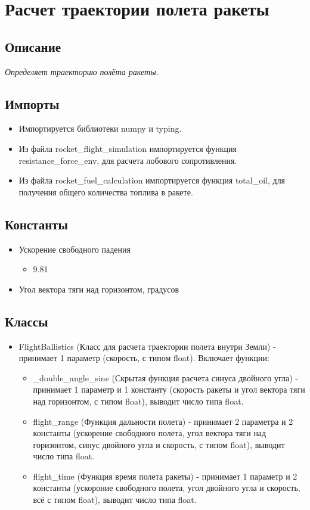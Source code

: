 \documentclass[a4paper, 12pt]{report}
\begin{document}
\chapter{Расчет траектории полета ракеты}
\section{Описание}
\textit{Определяет траекторию полёта ракеты.}
\section{Импорты}
\begin{itemize}
    \item Импортируется библиотеки numpy и typing.
    \item Из файла rocket\_flight\_simulation импортируется функция resistance\_force\_env, для расчета лобового сопротивления.
    \item Из файла rocket\_fuel\_calculation импортируется функция total\_oil, для получения общего количества топлива в ракете.
\end{itemize}
\section{Константы}
\begin{itemize}
    \item Ускорение свободного падения
    \begin{itemize}
        \item 9.81
    \end{itemize}
    \item Угол вектора тяги над горизонтом, градусов
    \begin{itemize}
    \end{itemize}
\end{itemize}
\section{Классы}
\begin{itemize}
    \item FlightBallistics (Класс для расчета траектории полета {\itseries внутри Земли}) - принимает 1 параметр (скорость, с типом float). Включает функции:
    \begin{itemize}
        \item \_double\_angle\_sine (Скрытая функция расчета синуса двойного угла) - принимает 1 параметр и 1 константу (скорость ракеты и угол вектора тяги над горизонтом, с типом float), выводит число типа float.
        \item flight\_range (Функция дальности полета) - принимает 2 параметра и 2 константы (ускорение свободного полета, угол вектора тяги над горизонтом, синус двойного угла и скорость, с типом float), выводит число типа float.
        \item flight\_time (Функция время полета ракеты) - принимает 1 параметр и 2 константы (ускороние свободного полета, угол двойного угла и скорость, всё с типом float), выводит число типа float.
    \end{itemize}
\end{itemize}
\clearpage
\end{document}
